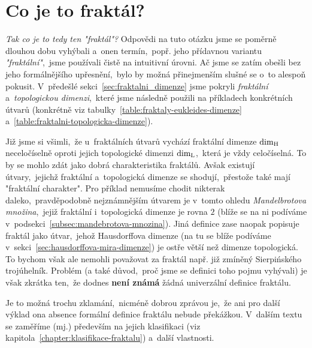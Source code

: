 \section{Co je to fraktál?}\label{sec:co-je-to-fraktal}
\emph{Tak co je to tedy ten "fraktál"?} Odpovědi na tuto otázku jsme se poměrně dlouhou dobu vyhýbali a~onen termín,~popř. jeho přídavnou variantu \emph{"fraktální"},~jsme používali čistě na intuitivní úrovni. Ač jsme se zatím obešli bez jeho formálnějšího upřesnění,~bylo by možná přinejmenším slušné se o~to alespoň pokusit. V~předešlé sekci~\ref{sec:fraktalni_dimenze} jsme pokryli \emph{fraktální} a~\emph{topologickou dimenzi},~které jsme následně použili na příkladech konkrétních útvarů (konkrétně viz tabulky~\ref{table:fraktaly-eukleides-dimenze} a~\ref{table:fraktalni-topologicka-dimenze}).

Již jsme si všimli,~že u~fraktálních útvarů vychází fraktální dimenze $\operatorname{dim_H}$ neceločíselně oproti jejich topologické dimenzi $\operatorname{dim_L}$,~která je vždy celočíselná. To by se mohlo zdát jako dobrá charakteristika fraktálů. Avšak existují útvary,~jejichž fraktální a~topologická dimenze se shodují,~přestože také mají "fraktální charakter". Pro příklad nemusíme chodit nikterak daleko,~pravděpodobně nejznámnějším útvarem je v~tomto ohledu \emph{Mandelbrotova množina},~jejiž fraktální i~topologická dimenze je rovna $2$ (blíže se na ni podíváme v~podsekci~\ref{subsec:mandebrotova-mnozina}). Jiná definice zase naopak popisuje fraktál jako útvar,~jehož Hausdorffova dimenze (na tu se blíže podíváme v~sekci~\ref{sec:hausdorffova-mira-dimenze}) je ostře větší než dimenze topologická. To bychom však ale nemohli považovat za fraktál např. již zmíněný Sierpińského trojúhelník. Problém (a také důvod,~proč jsme se definici toho pojmu vyhývali) je však zkrátka ten,~že dodnes \textbf{není známá} žádná univerzální definice fraktálu. \cite[str. 226]{Voracova2022}

Je to možná trochu zklamání,~nicméně dobrou zprávou je,~že ani pro další výklad ona absence formální definice fraktálu nebude překážkou. V~dalším textu se zaměříme (mj.) především na jejich klasifikaci (viz kapitola~\ref{chapter:klasifikace-fraktalu}) a~další vlastnosti.